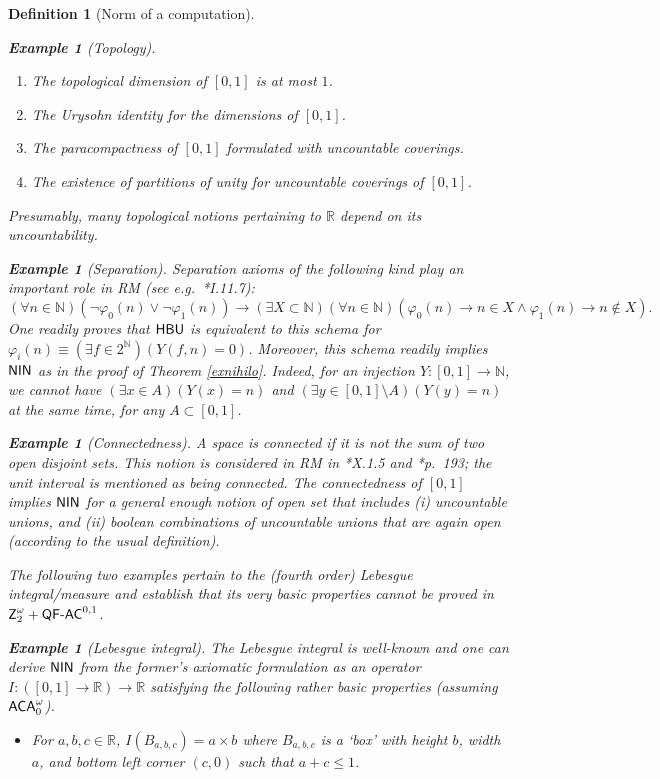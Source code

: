 \documentclass[reqno]{amsart}
\newtheorem{defi}[thm]{Definition}
\newtheorem{exa}[thm]{Example}
\def\Z{\textup{\textsf{Z}}}
\def\ACAo{\textup{\textsf{ACA}}_{0}^{\omega}}
\def\N{{\mathbb  N}}
\def\R{{\mathbb  R}}
\def\di{\rightarrow}
\def\QFAC{\textup{\textsf{QF-AC}}}
\def\HBU{\textup{\textsf{HBU}}}
\def\NIN{\textup{\textsf{NIN}}}
\numberwithin{equation}{section}
\numberwithin{thm}{section}
\begin{document}
\begin{defi}[Norm of a computation]
\begin{exa}[Topology]
\begin{enumerate}
\item The topological dimension of $[0,1]$ is at most $1$.
\item The Urysohn identity for the dimensions of $[0,1]$.
\item The paracompactness of $[0,1]$ formulated with uncountable coverings. 
\item The existence of partitions of unity for uncountable coverings of $[0,1]$.  
\end{enumerate}
Presumably, many topological notions pertaining to $\R$ depend on its uncountability. 
\end{exa}
\begin{exa}[Separation]\label{XXY}\rm
Separation axioms of the following kind play an important role in RM (see e.g.\ \cite{simpson2}*{I.11.7}):
\[
(\forall n\in \N)(\neg \varphi_{0}(n)\vee \neg\varphi_{1}(n))\di (\exists X\subset \N)(\forall n\in \N)(\varphi_{0}(n)\di n\in X\wedge \varphi_{1}(n)\di n\not\in X).
\]
One readily proves that $\HBU$ is equivalent to this schema for $\varphi_{i}(n)\equiv (\exists f\in 2^{\N})(Y(f, n)=0)$.  Moreover, this schema readily implies $\NIN$ as in the proof of Theorem \ref{exnihilo}.
Indeed, for an injection $Y:[0,1]\di \N$, we cannot have $(\exists x\in A)(Y(x)=n)$ and $(\exists y\in  [0,1]\setminus A)(Y(y)=n)$ at the same time, for any $A\subset [0,1]$.
\end{exa}
\begin{exa}[Connectedness]\rm
A space is \emph{connected} if it is not the sum of two open disjoint sets.  This notion is considered in RM in \cite{simpson2}*{X.1.5} and \cite{brownvi}*{p.\ 193}; the unit interval is mentioned as being connected.  
The connectedness of $[0,1]$ implies $\NIN$ for a general enough notion of open set that includes (i) uncountable unions, and (ii) boolean combinations of uncountable unions that are again open (according to the usual definition).  
\end{exa}
The following two examples pertain to the (fourth order) Lebesgue integral/measure and establish that its very basic properties cannot be proved in $\Z_{2}^{\omega}+\QFAC^{0,1}$.
\begin{exa}[Lebesgue integral]\rm
The Lebesgue integral is well-known and one can derive $\NIN$ from the former's axiomatic formulation as an operator $I:([0,1]\di \R)\di \R$ satisfying the following rather basic properties (assuming $\ACAo$). 
\begin{itemize}
\item For $a, b, c\in \R$, $I(B_{a, b, c})=a\times b$ where $B_{a, b, c}$ is a `box' with height $b$, width $a$, and bottom left corner $(c, 0)$ such that $a+c\leq 1$.  

\end{itemize}
\end{exa}
\end{defi}
\end{document}
